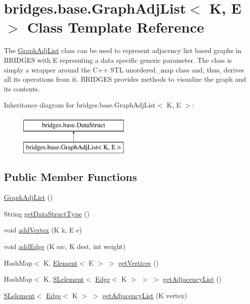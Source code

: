 \hypertarget{classbridges_1_1base_1_1_graph_adj_list}{}\section{bridges.\+base.\+Graph\+Adj\+List$<$ K, E $>$ Class Template Reference}
\label{classbridges_1_1base_1_1_graph_adj_list}


The \hyperlink{classbridges_1_1base_1_1_graph_adj_list}{Graph\+Adj\+List} class can be used to represent adjacency list based graphs in B\+R\+I\+D\+G\+E\+S with E represnting a data specific generic parameter. The class is simply a wrapper around the C++ S\+T\+L unordered\+\_\+map class and, thus, derives all its operations from it. B\+R\+I\+D\+G\+E\+S provides methods to visualize the graph and its contents.  


Inheritance diagram for bridges.\+base.\+Graph\+Adj\+List$<$ K, E $>$\+:\begin{figure}[H]
\begin{center}
\leavevmode
\includegraphics[height=2.000000cm]{classbridges_1_1base_1_1_graph_adj_list}
\end{center}
\end{figure}
\subsection*{Public Member Functions}
\begin{DoxyCompactItemize}
\item 
\hyperlink{classbridges_1_1base_1_1_graph_adj_list_a822f5f0981773a227c98c463850a0700}{Graph\+Adj\+List} ()
\item 
String \hyperlink{classbridges_1_1base_1_1_graph_adj_list_a6995a5dcee3b07e041e12e27241f9423}{get\+Data\+Struct\+Type} ()
\item 
void \hyperlink{classbridges_1_1base_1_1_graph_adj_list_a2fdb7b6c143d1beb245a333db105372c}{add\+Vertex} (K k, E e)
\item 
void \hyperlink{classbridges_1_1base_1_1_graph_adj_list_a955fd8c7211f482826b47ad800702c10}{add\+Edge} (K src, K dest, int weight)
\item 
Hash\+Map$<$ K, \hyperlink{classbridges_1_1base_1_1_element}{Element}$<$ E $>$ $>$ \hyperlink{classbridges_1_1base_1_1_graph_adj_list_a19abf0bd09f0420e61cc144aec141f0a}{get\+Vertices} ()
\item 
Hash\+Map$<$ K, \hyperlink{classbridges_1_1base_1_1_s_lelement}{S\+Lelement}$<$ \hyperlink{classbridges_1_1base_1_1_edge}{Edge}$<$ K $>$ $>$ $>$ \hyperlink{classbridges_1_1base_1_1_graph_adj_list_a61ebebad4b053797240fef2b42b57630}{get\+Adjacency\+List} ()
\item 
\hyperlink{classbridges_1_1base_1_1_s_lelement}{S\+Lelement}$<$ \hyperlink{classbridges_1_1base_1_1_edge}{Edge}$<$ K $>$ $>$ \hyperlink{classbridges_1_1base_1_1_graph_adj_list_a331531e9ce428c35321fae6df143fbcf}{get\+Adjacency\+List} (K vertex)
\end{DoxyCompactItemize}
